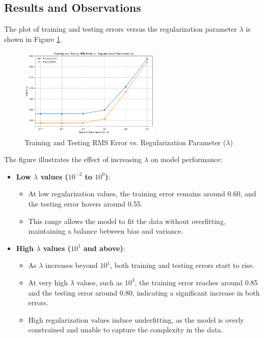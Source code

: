 \documentclass{article}
\begin{document}
	 \subsection*{Results and Observations}
	
	The plot of training and testing errors versus the regularization parameter $\lambda$ is shown in Figure \ref{fig:regularization_error_plot}. 
	
	\begin{figure}[h!]
		\centering
		\includegraphics[width=0.6\textwidth]{images/q4_part3.png} 
		\caption{Training and Testing RMS Error vs. Regularization Parameter ($\lambda$)}
		\label{fig:regularization_error_plot}
	\end{figure}
	
	The figure illustrates the effect of increasing $\lambda$ on model performance:
	
	\begin{itemize}
		\item \textbf{Low $\lambda$ values ($10^{-2}$ to $10^{0}$)}:
		\begin{itemize}
			\item At low regularization values, the training error remains around 0.60, and the testing error hovers around 0.55.
			\item This range allows the model to fit the data without overfitting, maintaining a balance between bias and variance.
		\end{itemize}
		
		\item \textbf{High $\lambda$ values ($10^{1}$ and above)}:
		\begin{itemize}
			\item As $\lambda$ increases beyond $10^{1}$, both training and testing errors start to rise.
			\item At very high $\lambda$ values, such as $10^{3}$, the training error reaches around 0.85 and the testing error around 0.80, indicating a significant increase in both errors.
			\item High regularization values induce underfitting, as the model is overly constrained and unable to capture the complexity in the data.
		\end{itemize}
	\end{itemize}
	
\end{document}
